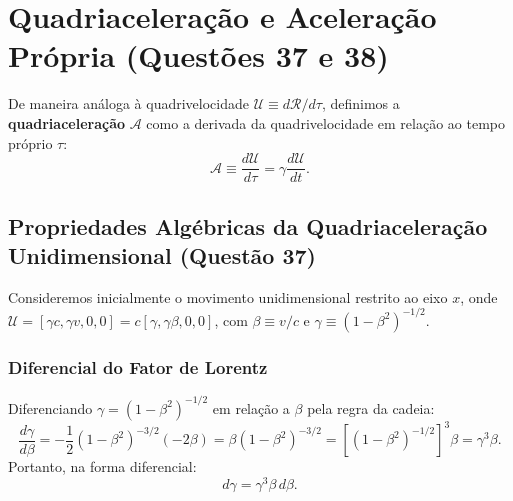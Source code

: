 \documentclass[11pt, a4paper]{article}
\begin{document}
\section{Quadriaceleração e Aceleração Própria (Questões 37 e 38)}

De maneira análoga à quadrivelocidade $\mathcal{U} \equiv d\mathcal{R}/d\tau$, definimos a \textbf{quadriaceleração} $\mathcal{A}$ como a derivada da quadrivelocidade em relação ao tempo próprio $\tau$:
\begin{equation}
\mathcal{A} \equiv \frac{d\mathcal{U}}{d\tau} = \gamma \frac{d\mathcal{U}}{dt}.
\end{equation}

\subsection{Propriedades Algébricas da Quadriaceleração Unidimensional (Questão 37)}

Consideremos inicialmente o movimento unidimensional restrito ao eixo $x$, onde $\mathcal{U} = [\gamma c, \gamma v, 0, 0] = c [\gamma, \gamma \beta, 0, 0]$, com $\beta \equiv v/c$ e $\gamma \equiv (1 - \beta^2)^{-1/2}$.

\subsubsection{Diferencial do Fator de Lorentz}
Diferenciando $\gamma = (1 - \beta^2)^{-1/2}$ em relação a $\beta$ pela regra da cadeia:
\begin{equation}
\frac{d\gamma}{d\beta} = -\frac{1}{2} (1 - \beta^2)^{-3/2} (-2\beta) = \beta (1 - \beta^2)^{-3/2} = \left[ (1 - \beta^2)^{-1/2} \right]^3 \beta = \gamma^3 \beta.
\end{equation}
Portanto, na forma diferencial:
\begin{equation}
d\gamma = \gamma^3 \beta \, d\beta. \label{eq:dgamma}
\end{equation}
\end{document}
